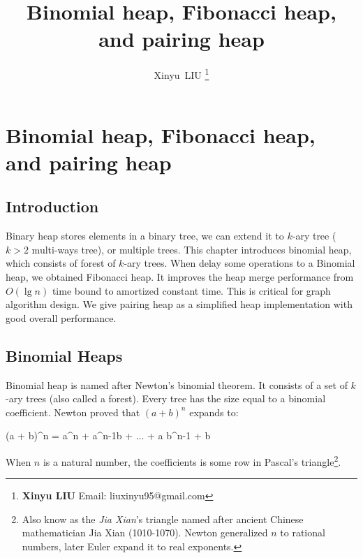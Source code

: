 \documentclass[b5paper]{article}
\begin{document}
\title{Binomial heap, Fibonacci heap, and pairing heap}

\author{Xinyu~LIU
\thanks{{\bfseries Xinyu LIU} \newline
  Email: liuxinyu95@gmail.com \newline}
  }

\maketitle
\fi


\ifx\wholebook\relax
\chapter{Binomial heap, Fibonacci heap, and pairing heap}
\fi

\section{Introduction}
\label{introduction}

Binary heap stores elements in a binary tree, we can extend it to $k$-ary tree\cite{K-ary-tree} ($k > 2$ multi-ways tree), or multiple trees. This chapter introduces binomial heap, which consists of forest of $k$-ary trees. When delay some operations to a Binomial heap, we obtained Fibonacci heap. It improves the heap merge performance from $O(\lg n)$ time bound to amortized constant time. This is critical for graph algorithm design. We give pairing heap as a simplified heap implementation with good overall performance.

\section{Binomial Heaps}
\label{sec:binomial-heap} 

Binomial heap is named after Newton's binomial theorem. It consists of a set of $k$-ary trees (also called a forest). Every tree has the size equal to a binomial coefficient. Newton proved that $(a + b)^n$ expands to:

\be
(a + b)^n = a^n +  a^{n-1}b + ... +  a b^{n-1} + b
\ee

When $n$ is a natural number, the coefficients is some row in Pascal's triangle\footnote{Also know as the {\em Jia Xian}'s triangle named after ancient Chinese mathematician Jia Xian (1010-1070). Newton generalized $n$ to rational numbers, later Euler expand it to real exponents.}\cite{wiki-pascal-triangle}.
\end{document}
